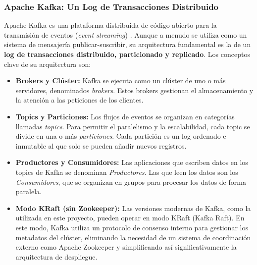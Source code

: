 \subsubsection{Apache Kafka: Un Log de Transacciones Distribuido}
Apache Kafka es una plataforma distribuida de código abierto para la transmisión de eventos (\textit{event streaming}) \cite{KafkaWebDoc}. Aunque a menudo se utiliza como un sistema de mensajería publicar-suscribir, su arquitectura fundamental es la de un \textbf{log de transacciones distribuido, particionado y replicado}. Los conceptos clave de su arquitectura son:
\begin{itemize}
    \item \textbf{Brokers y Clúster:} Kafka se ejecuta como un clúster de uno o más servidores, denominados \textit{brokers}. Estos brokers gestionan el almacenamiento y la atención a las peticiones de los clientes.
    \item \textbf{Topics y Particiones:} Los flujos de eventos se organizan en categorías llamadas \textit{topics}. Para permitir el paralelismo y la escalabilidad, cada topic se divide en una o más \textit{particiones}. Cada partición es un log ordenado e inmutable al que solo se pueden añadir nuevos registros.
    \item \textbf{Productores y Consumidores:} Las aplicaciones que escriben datos en los topics de Kafka se denominan \textit{Productores}. Las que leen los datos son los \textit{Consumidores}, que se organizan en grupos para procesar los datos de forma paralela.
    \item \textbf{Modo KRaft (sin Zookeeper):} Las versiones modernas de Kafka, como la utilizada en este proyecto, pueden operar en modo KRaft (Kafka Raft). En este modo, Kafka utiliza un protocolo de consenso interno para gestionar los metadatos del clúster, eliminando la necesidad de un sistema de coordinación externo como Apache Zookeeper y simplificando así significativamente la arquitectura de despliegue.
\end{itemize}

